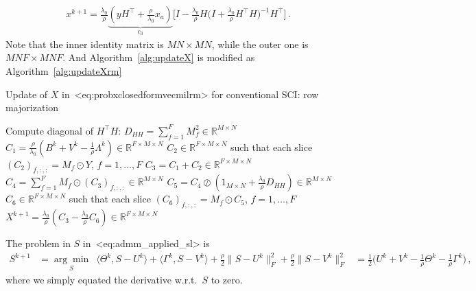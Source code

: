 \documentclass[a4paper,11pt]{article}
\def\\{}%
\def\eqref#1{<#1>}%
\newcommand{\mypar}[1]{\bigskip\noindent {\bf #1.}}
\begin{document}
\begin{align}
	x^{k+1}
	=
	\frac{\lambda_0}{\rho}
	\underbrace{\left(y H^\top + \frac{\rho}{\lambda_0} x_a\right)}_{c_3}
	\bigg[
		I - \frac{\lambda_0}{\rho}
		H\big( I + \frac{\lambda_0}{\rho}H^\top H\big)^{-1}H^\top
		\bigg]\,.
	\label{eq:probxclosedformvecmilrm}
\end{align}
Note that the inner identity matrix is $MN \times MN$, while the outer one is
$MNF \times MNF$. And Algorithm~\ref{alg:updateX} is modified as
Algorithm~\ref{alg:updateXrm}
\begin{algorithm}
	\caption{Update of $X$ in~\eqref{eq:probxclosedformvecmilrm} for
		conventional SCI: row majorization}
	\label{alg:updateXrm}
	\begin{algorithmic}[1]
		\algrenewcommand{}
		\Require Compute diagonal of $H^\top H$: $D_{HH} = \sum_{f=1}^{F} M_f^2 \in \mathbb{R}^{M\times N}$
		\algrenewcommand{}
		\Require
		\State $C_1 = \frac{\rho}{\lambda_0} (B^k + V^k - \frac{1}{\rho}\Lambda^k) \in \mathbb{R}^{F\times M\times N}$
		\State $C_2 \in \mathbb{R}^{F\times M\times N}$ such that each slice
		$(C_2)_{f,:, :} = M_f \odot Y$, $f = 1, \ldots, F$
		\State $C_3 = C_1 + C_2 \in \mathbb{R}^{F\times M \times N}$
		\State $C_4 = \sum_{f=1}^{F} M_f \odot (C_3)_{f, :, :} \in \mathbb{R}^{M\times N}$
		\State $C_5 = C_4 \oslash (1_{M\times N} + \frac{\lambda_0}{\rho}D_{HH}) \in \mathbb{R}^{M\times N}$
		\label{subAlg:inversesteprm}
		\State $C_6 \in \mathbb{R}^{F\times M\times N}$ such that each slice
		$(C_6)_{f, :, :} = M_f \odot C_5$, $f = 1, \ldots, F$
		\State $X^{k+1} = \frac{\lambda_0}{\rho}(C_3 - \frac{\lambda_0}{\rho}C_6) \in \mathbb{R}^{F\times
				M\times N}$
	\end{algorithmic}
\end{algorithm}

\mypar{Updating $\bm{S}$}
The problem in $S$ in~\eqref{eq:admm_applied_sl} is
\begin{align*}
	S^{k+1}
	 & =
	\underset{S}{\arg\min} \,\,\,
	\langle\Theta^k, S - U^k\rangle
	+
	\langle\Gamma^k, S - V^k\rangle
	+
	\frac{\rho}{2}
	\|S - U^k\|_{F}^2
	+
	\frac{\rho}{2}
	\|S - V^k\|_{F}^2
	\\
	 & =
	\frac{1}{2}
	\Big(U^k + V^k - \frac{1}{\rho}\Theta^k - \frac{1}{\rho}\Gamma^k\Big)\,,
\end{align*}
where we simply equated the derivative w.r.t.\ $S$ to zero.
\end{document}
